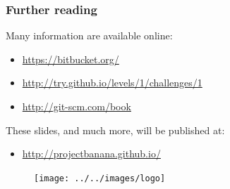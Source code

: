 \documentclass{beamer}
\begin{document}
% 
\begin{frame}
\frametitle{Further reading}
Many information are available online:
\begin{itemize}
 \item \url{https://bitbucket.org/}
 \item \url{http://try.github.io/levels/1/challenges/1}
 \item \url{http://git-scm.com/book}
\end{itemize}
These slides, and much more, will be published at:
\begin{itemize}
 \item \url{http://projectbanana.github.io/}
\end{itemize}
 \begin{figure}
\centering
 \texttt{[image: ../../images/logo]}
\end{figure}
\end{frame}
\end{document}
